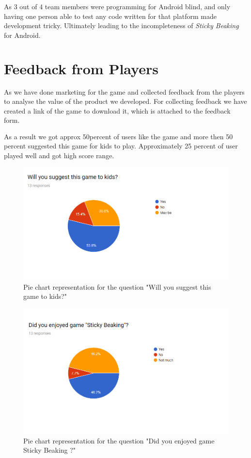\documentclass[12pt]{article}
\newcommand{\game}[2]{\textit{#1}}{}
\begin{document}
As 3 out of 4 team members were programming for Android blind, and only having one person able to test any code written for that platform made development tricky. Ultimately leading to the incompleteness of \game{Sticky Beaking}{ } for Android.

\section{Feedback from Players}
As we have done marketing for the game and collected feedback from the players to analyse the value of the product we developed. For collecting feedback we have created a link of the game to download it, which is attached to the feedback form.

As a result we got approx 50percent of users like the game and more then 50 percent suggested this game for kids to play. Approximately 25 percent of user played well and got high score range. 

\begin{figure}[H]
\centering
\includegraphics[scale=0.7]{e.png}
\caption{Pie chart representation for the question "Will you suggest this game to kids?" }
\label{suggestiontokids}
\end{figure}

\begin{figure}[H]
\centering
\includegraphics[scale=0.7]{f.png}
\caption{Pie chart representation for the question "Did you enjoyed game Sticky Beaking ?" }
\label{enjoyed}
\end{figure}
\end{document}
